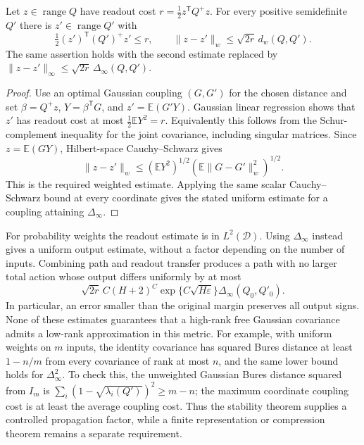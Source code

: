 \begin{lemma}
\label{lem:critical-bures-readout}
Let $z\in\operatorname{range}Q$ have readout cost
$r=\tfrac12z^{\mathsf T}Q^+z$. For every positive semidefinite
$Q'$ there is $z'\in\operatorname{range}Q'$ with
\[
 \tfrac12(z')^{\mathsf T}(Q')^+z'\le r,
 \qquad \|z-z'\|_w\le\sqrt{2r}\,d_w(Q,Q').
\]
The same assertion holds with the second estimate replaced by
$\|z-z'\|_\infty\le\sqrt{2r}\,\Delta_\infty(Q,Q')$.
\end{lemma}

\begin{proof}
Use an optimal Gaussian coupling $(G,G')$ for the chosen distance and set
$\beta=Q^+z$, $Y=\beta^{\mathsf T}G$, and $z'=\mathbb E(G'Y)$.
Gaussian linear regression shows that $z'$ has readout cost at most
$\tfrac12\mathbb EY^2=r$. Equivalently this follows from the
Schur-complement inequality for the joint covariance, including
singular matrices. Since $z=\mathbb E(GY)$, Hilbert-space
Cauchy--Schwarz gives
\[
 \|z-z'\|_w
 \le(\mathbb EY^2)^{1/2}
       (\mathbb E\|G-G'\|_w^2)^{1/2}.
\]
This is the required weighted estimate. Applying the same scalar
Cauchy--Schwarz bound at every coordinate gives the stated uniform
estimate for a coupling attaining $\Delta_\infty$.
\end{proof}

For probability weights the readout estimate is in
$L^2(\mathcal D)$. Using $\Delta_\infty$ instead gives a uniform
output estimate, without a factor depending on the number of inputs.
Combining path and readout transfer produces a path with no larger
total action whose output differs uniformly by at most
\[
 \sqrt{2r}\,C(H+2)^C\exp\{C\sqrt{H\varepsilon}\}
       \Delta_\infty(Q_0,Q'_0).
\]
In particular, an error smaller than the original margin preserves
all output signs. None of these estimates guarantees that
a high-rank free Gaussian covariance admits a low-rank approximation
in this metric. For example, with uniform weights on $m$ inputs,
the identity covariance has squared Bures distance at least
$1-n/m$ from every covariance of rank at most $n$, and the same lower
bound holds for $\Delta_\infty^2$. To check this, the unweighted
Gaussian Bures distance squared from $I_m$ is
$\sum_i(1-\sqrt{\lambda_i(Q')})^2\ge m-n$; the maximum
coordinate coupling cost is at least the average coupling cost.
Thus the stability theorem supplies a controlled propagation factor,
while a finite representation or compression theorem remains a
separate requirement.
